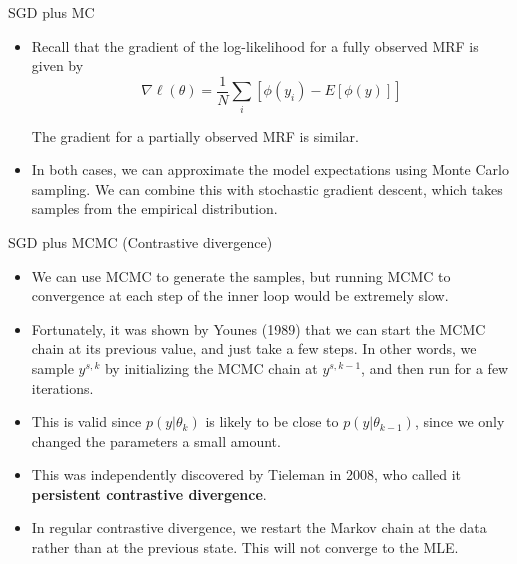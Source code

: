 \documentclass[10pt,mathserif]{beamer}
\begin{document}
\begin{frame}{SGD plus MC}
\begin{itemize}
    \item Recall that the gradient of the log-likelihood for a fully observed MRF is given by
    \begin{equation}
        \nabla\ell(\theta) = \frac{1}{N}\sum_i[\phi(y_i) - E[\phi(y)]]
    \end{equation}
    
    The gradient for a partially observed MRF is similar.
    \item In both cases, we can approximate the model expectations using Monte Carlo sampling. We can combine this with stochastic gradient descent, which takes samples from the empirical distribution.
\end{itemize}
 \end{frame}

\begin{frame}{SGD plus MCMC (Contrastive divergence)}
\begin{itemize}
    \item We can use MCMC to generate the samples, but running MCMC to convergence at each step of the inner loop would be extremely slow.
    \item Fortunately, it was shown by Younes (1989) that we can start the MCMC chain at its previous value, and just take a few steps. In other words, we sample $y^{s,k}$ by initializing the MCMC chain at $y^{s,k-1}$, and then run for a few iterations.
    \item This is valid since $p(y|\theta_k)$ is likely to be close to $p(y|\theta_{k-1})$, since we only changed the parameters a small amount.
    \item This was independently discovered by Tieleman in 2008, who called it \textbf{persistent contrastive divergence}.
    \item In regular contrastive divergence, we restart the Markov chain at the data rather than at the previous state. This will not converge to the MLE. 
\end{itemize}
\end{frame}
\end{document}
